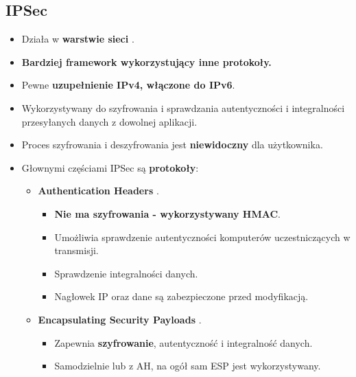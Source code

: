 \documentclass[../sk-egzamin.tex]{subfiles}
\begin{document}

\subsection*{IPSec}
\begin{itemize}
    \item Działa w \textbf{warstwie sieci} .

    \item \textbf{Bardziej framework wykorzystujący inne protokoły.}

    \item Pewne \textbf{uzupełnienie IPv4, włączone do IPv6}.

    \item Wykorzystywany do szyfrowania i sprawdzania autentyczności i
    integralności przesyłanych danych z dowolnej aplikacji.

    \item Proces szyfrowania i deszyfrowania jest \textbf{niewidoczny}
    dla użytkownika.

    \item Głownymi częściami IPSec są \textbf{protokoły}:
    \begin{itemize}
        \item \textbf{Authentication Headers} .
        \begin{itemize}
            \item \textbf{Nie ma szyfrowania - wykorzystywany HMAC}.
            \item Umożliwia sprawdzenie autentyczności komputerów
            uczestniczących w transmisji.
            \item Sprawdzenie integralności danych.
            \item Nagłowek IP oraz dane są zabezpieczone przed modyfikacją.
        \end{itemize}
        \item \textbf{Encapsulating Security Payloads} .
        \begin{itemize}
            \item Zapewnia \textbf{szyfrowanie}, autentyczność i integralność
            danych.
            \item Samodzielnie lub z AH, na ogół sam ESP jest wykorzystywany.
        \end{itemize}
    \end{itemize}
\end{itemize}
\end{document}
